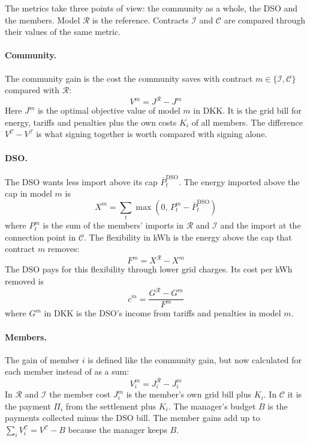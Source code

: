 The metrics take three points of view: the community as a whole, the DSO and the members. Model $\mathcal{R}$ is the reference. Contracts $\mathcal{I}$ and $\mathcal{C}$ are compared through their values of the same metric.

\paragraph{Community.}
The community gain is the cost the community saves with contract $m \in \{\mathcal{I},\mathcal{C}\}$ compared with $\mathcal{R}$:
\begin{equation}
    V^m = J^{\mathcal{R}} - J^m
    \label{eq:gain}
\end{equation}
Here $J^m$ is the optimal objective value of model $m$ in DKK. It is the grid bill for energy, tariffs and penalties plus the own costs $K_i$ of all members. The difference $V^{\mathcal{C}} - V^{\mathcal{I}}$ is what signing together is worth compared with signing alone.

\paragraph{DSO.}
The DSO wants less import above its cap $\overline{P}_t^{\mathrm{DSO}}$. The energy imported above the cap in model $m$ is
\begin{equation}
    X^m = \sum_t \max\left(0,\, P_t^m - \overline{P}_t^{\mathrm{DSO}}\right)
    \label{eq:exceedance}
\end{equation}
where $P_t^m$ is the sum of the members' imports in $\mathcal{R}$ and $\mathcal{I}$ and the import at the connection point in $\mathcal{C}$. The flexibility in kWh is the energy above the cap that contract $m$ removes:
\begin{equation}
    F^m = X^{\mathcal{R}} - X^m
    \label{eq:flexibility}
\end{equation}
The DSO pays for this flexibility through lower grid charges. Its cost per kWh removed is
\begin{equation}
    c^m = \frac{G^{\mathcal{R}} - G^m}{F^m}
    \label{eq:dso_cost}
\end{equation}
where $G^m$ in DKK is the DSO's income from tariffs and penalties in model $m$.


\paragraph{Members.}
The gain of member $i$ is defined like the community gain, but now calculated for each member instead of as a sum:
\begin{equation}
    V_i^m = J_i^{\mathcal{R}} - J_i^m
    \label{eq:gain_member}
\end{equation}
In $\mathcal{R}$ and $\mathcal{I}$ the member cost $J_i^m$ is the member's own grid bill plus $K_i$. In $\mathcal{C}$ it is the payment $\Pi_i$ from the settlement plus $K_i$. The manager's budget $B$ is the payments collected minus the DSO bill. The member gains add up to $\sum_i V_i^{\mathcal{C}} = V^{\mathcal{C}} - B$ because the manager keeps $B$.


